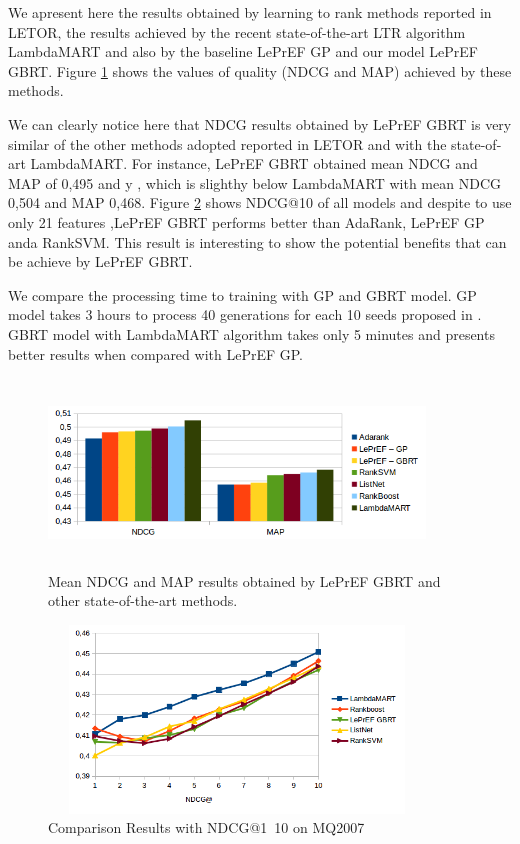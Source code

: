 \documentclass[preprint,12pt,3p]{elsarticle}
\begin{document}
We apresent here the results obtained by learning to rank methods reported in LETOR, the results achieved by the recent state-of-the-art LTR algorithm LambdaMART and also by the baseline LePrEF GP \cite{costa2012lepref} and our model LePrEF GBRT. Figure \ref{fig:baseline} shows the values of quality (NDCG and MAP) achieved by these methods.

We can clearly notice here that NDCG results obtained by LePrEF GBRT is very similar of the other methods adopted reported in LETOR and with the state-of-art LambdaMART. For instance, LePrEF GBRT obtained mean NDCG and MAP of 0,495 and y , which is slighthy below LambdaMART with mean NDCG 0,504 and MAP 0,468. Figure \ref{fig:ncdg10} shows NDCG@10 of all models and despite to use only 21 features ,LePrEF GBRT performs better than AdaRank, LePrEF GP anda RankSVM. This result is interesting to show the potential benefits that can be achieve by LePrEF GBRT. 

We compare the processing time to training with GP and GBRT model. GP model takes 3 hours to process 40 generations for each 10 seeds proposed in \cite{costa2012lepref}. GBRT model with LambdaMART algorithm takes only 5 minutes and presents better results when compared with LePrEF GP.


\begin{figure}[h!]
\begin{center}
\includegraphics[width=10cm, height=5cm]{im_baseline.png}
\caption{Mean NDCG and MAP results obtained by LePrEF GBRT and other state-of-the-art methods.}
\label{fig:baseline}
\end{center}
\end{figure}


\begin{figure}[h!]
\begin{center}
\includegraphics[width=10cm, height=5cm]{im_ndcg_baseline.png}
\caption{Comparison Results with NDCG@1~10 on MQ2007}
\label{fig:ncdg10}
\end{center}
\end{figure}
\end{document}
